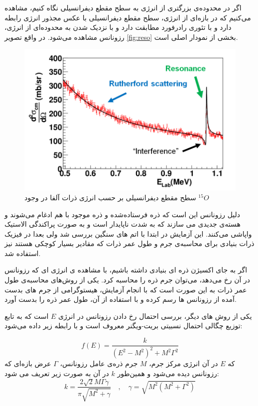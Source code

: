 \documentclass[12pt,a4paper]{article}
\begin{document}
	اگر در محدوده‌ی بزرگتری از انرژی به سطح مقطع دیفرانسیلی نگاه کنیم، مشاهده می‌کنیم که در بازه‌ای از انرژی، سطح مقطع دیفرانسیلی با عکس مجذور انرژی رابطه
	دارد و با تئوری رادرفورد مطابقت دارد و با نزدیک شدن به محدوده‌ای از انرژی، رزونانس مشاهده می‌شود. در واقع تصویر 
	\ref{fig:reso}
	بخشی از نمودار اصلی است.
	\begin{figure}[h]
		\centering
		\includegraphics[width=\linewidth]{captures/Capture3.png}
		\caption{سطح مقطع دیفرانسیلی بر حسب انرژی ذرات آلفا در وجود 
			${}^{15}O$
		}
	\end{figure}
	
	دلیل رزونانس این است که ذره فرستاده‌شده و ذره موجود با هم ادغام می‌شوند  و هسته‌ی جدیدی می سازند که به شدت ناپایدار است و به صورت پراکندگی الاستیک واپاشی
	می‌کنند. این آزمایش در ابتدا با اتم های سنگین بررسی شد ولی بعدا در فیزیک ذرات بنیادی برای محاسبه‌ی جرم و طول عمر ذرات که مقادیر بسیار کوچکی هستند نیز
	استفاده شد.
	
	اگر به جای اکسیژن ذره ای بنیادی داشته باشیم، با مشاهده ی انرژی ای که رزونانس در آن رخ می‌دهد، می‌توان جرم ذره را محاسبه کرد. یکی از روش‌های محاسبه‌ی
	طول عمر ذرات به این صورت است که  با انجام آزمایش، هیستوگرامی از جرم های بدست آمده از رزونانس ها رسم کرده و با استفاده از آن، طول عمر ذره را بدست آورد.
	
	یکی از روش های دیگر، بررسی احتمال رخ دادن رزونانس در انرژی $E$ است که به تابع توزیع چگالی احتمال نسبیتی بریت-ویگنر معروف است و
	با رابطه زیر داده می‌شود\cite{breit_wigner_1936}:
	
	\begin{equation}
		f(E) = \frac{k}{\left(E^2-M^2\right)^2+M^2\Gamma^2}
	\end{equation}
	که $E$ در آن انرژی مرکز جرم، $M$ جرم ذره‌ی عامل رزونانس، $\Gamma$ عرض بازه‌ای که رزونانس دیده می‌شود و همین‌طور
	$k$ در آن به صورت زیر تعریف می شود:
	\begin{equation}
		k = \frac{2 \sqrt{2} M \Gamma  \gamma }{\pi \sqrt{M^2+\gamma}}   \quad  , \quad     \gamma=\sqrt{M^2\left(M^2+\Gamma^2\right)}
	\end{equation}
	
\end{document}
